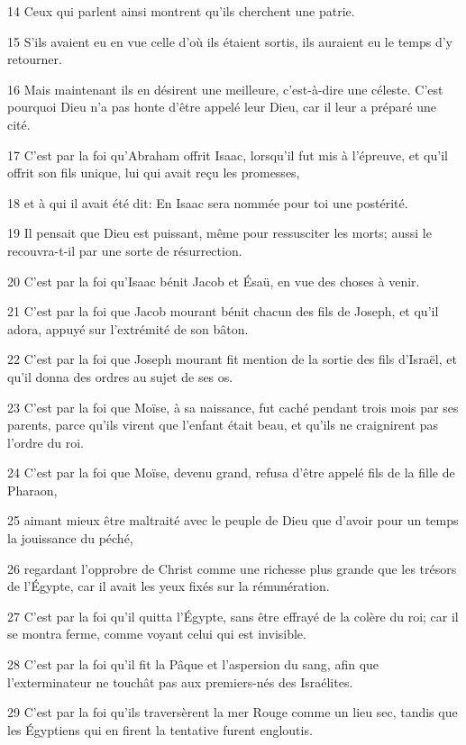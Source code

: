 \par 14 Ceux qui parlent ainsi montrent qu'ils cherchent une patrie.
\par 15 S'ils avaient eu en vue celle d'où ils étaient sortis, ils auraient eu le temps d'y retourner.
\par 16 Mais maintenant ils en désirent une meilleure, c'est-à-dire une céleste. C'est pourquoi Dieu n'a pas honte d'être appelé leur Dieu, car il leur a préparé une cité.
\par 17 C'est par la foi qu'Abraham offrit Isaac, lorsqu'il fut mis à l'épreuve, et qu'il offrit son fils unique, lui qui avait reçu les promesses,
\par 18 et à qui il avait été dit: En Isaac sera nommée pour toi une postérité.
\par 19 Il pensait que Dieu est puissant, même pour ressusciter les morts; aussi le recouvra-t-il par une sorte de résurrection.
\par 20 C'est par la foi qu'Isaac bénit Jacob et Ésaü, en vue des choses à venir.
\par 21 C'est par la foi que Jacob mourant bénit chacun des fils de Joseph, et qu'il adora, appuyé sur l'extrémité de son bâton.
\par 22 C'est par la foi que Joseph mourant fit mention de la sortie des fils d'Israël, et qu'il donna des ordres au sujet de ses os.
\par 23 C'est par la foi que Moïse, à sa naissance, fut caché pendant trois mois par ses parents, parce qu'ils virent que l'enfant était beau, et qu'ils ne craignirent pas l'ordre du roi.
\par 24 C'est par la foi que Moïse, devenu grand, refusa d'être appelé fils de la fille de Pharaon,
\par 25 aimant mieux être maltraité avec le peuple de Dieu que d'avoir pour un temps la jouissance du péché,
\par 26 regardant l'opprobre de Christ comme une richesse plus grande que les trésors de l'Égypte, car il avait les yeux fixés sur la rémunération.
\par 27 C'est par la foi qu'il quitta l'Égypte, sans être effrayé de la colère du roi; car il se montra ferme, comme voyant celui qui est invisible.
\par 28 C'est par la foi qu'il fit la Pâque et l'aspersion du sang, afin que l'exterminateur ne touchât pas aux premiers-nés des Israélites.
\par 29 C'est par la foi qu'ils traversèrent la mer Rouge comme un lieu sec, tandis que les Égyptiens qui en firent la tentative furent engloutis.
